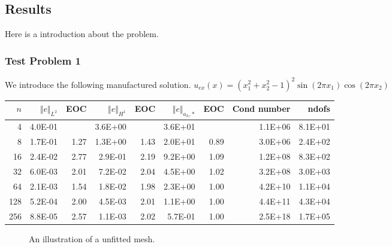 
\subsection{Results}%
\label{sub:results}

Here is a introduction about the problem.

\subsubsection{Test Problem 1}%
\label{ssub:test_problem_1}


We introduce the following manufactured solution.
$u_{ex}(x) = (x_1^2 + x_2^2 - 1)^2 \sin(2\pi x_1) \cos(2\pi x_2)$





\begin{table}[h!]
  \begin{tabular}{rrrrrrrrr}
    \hline\hline
    \textbf{$n$} & \textbf{$\Vert e \Vert_{L^2}$} & \textbf{EOC} & \textbf{$ \Vert e \Vert_{H^1}$} & \textbf{EOC} & \textbf{$\Vert e \Vert_{ a_h,* }$} & \textbf{EOC} & \textbf{Cond number} & \textbf{ndofs} \\\hline
    4 & 4.0E-01 &  & 3.6E+00 &  & 3.6E+01 &  & 1.1E+06 & 8.1E+01 \\
    8 & 1.7E-01 & 1.27 & 1.3E+00 & 1.43 & 2.0E+01 & 0.89 & 3.0E+06 & 2.4E+02 \\
    16 & 2.4E-02 & 2.77 & 2.9E-01 & 2.19 & 9.2E+00 & 1.09 & 1.2E+08 & 8.3E+02 \\
    32 & 6.0E-03 & 2.01 & 7.2E-02 & 2.04 & 4.5E+00 & 1.02 & 3.2E+08 & 3.0E+03 \\
    64 & 2.1E-03 & 1.54 & 1.8E-02 & 1.98 & 2.3E+00 & 1.00 & 4.2E+10 & 1.1E+04 \\
    128 & 5.2E-04 & 2.00 & 4.5E-03 & 2.01 & 1.1E+00 & 1.00 & 4.4E+11 & 4.3E+04 \\
    256 & 8.8E-05 & 2.57 & 1.1E-03 & 2.02 & 5.7E-01 & 1.00 & 2.5E+18 & 1.7E+05 \\\hline\hline
  \end{tabular}
\end{table}


\begin{figure}[h!]
\centering

\caption{An illustration of a unfitted mesh.}
\label{fig:domain_unfitted_mesh}
\end{figure}

